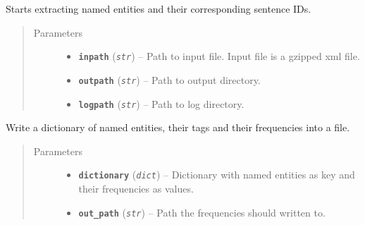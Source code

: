 \documentclass[letterpaper,10pt,english]{sphinxmanual}
\begin{document}
\begin{fulllineitems}
\label{src.prep.nes:src.prep.nes.extract_nes.process}
Starts extracting named entities and their corresponding sentence IDs.
\begin{quote}\begin{description}
\item[{Parameters}] \leavevmode\begin{itemize}
\item {} 
\textbf{\texttt{inpath}} (\emph{\texttt{str}}) -- Path to input file. Input file is a gzipped xml file.

\item {} 
\textbf{\texttt{outpath}} (\emph{\texttt{str}}) -- Path to output directory.

\item {} 
\textbf{\texttt{logpath}} (\emph{\texttt{str}}) -- Path to log directory.

\end{itemize}

\end{description}\end{quote}

\end{fulllineitems}


\begin{fulllineitems}
\label{src.prep.nes:src.prep.nes.extract_nes.write_dict_into_file}
Write a dictionary of named entities, their tags and their frequencies into a file.
\begin{quote}\begin{description}
\item[{Parameters}] \leavevmode\begin{itemize}
\item {} 
\textbf{\texttt{dictionary}} (\emph{\texttt{dict}}) -- Dictionary with named entities as key and their frequencies as values.

\item {} 
\textbf{\texttt{out\_path}} (\emph{\texttt{str}}) -- Path the frequencies should written to.

\end{itemize}

\end{description}\end{quote}

\end{fulllineitems}
\end{document}
